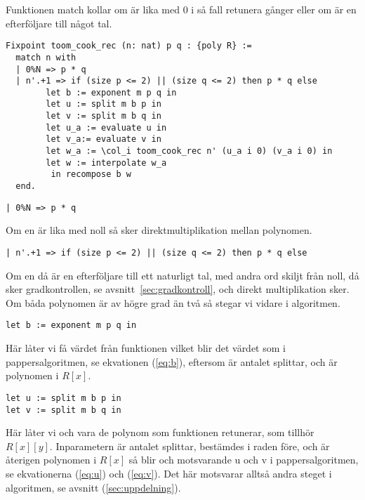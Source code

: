 Funktionen match kollar om  är lika med 0 i så fall retunera  gånger
 eller om  är en efterföljare till något tal.


\begin{lstlisting}
Fixpoint toom_cook_rec (n: nat) p q : {poly R} :=
  match n with
  | 0%N => p * q
  | n'.+1 => if (size p <= 2) || (size q <= 2) then p * q else
        let b := exponent m p q in
        let u := split m b p in
        let v := split m b q in
        let u_a := evaluate u in
        let v_a:= evaluate v in
        let w_a := \col_i toom_cook_rec n' (u_a i 0) (v_a i 0) in
        let w := interpolate w_a
         in recompose b w
  end.
\end{lstlisting}

\begin{lstlisting}
| 0%N => p * q
\end{lstlisting}

Om en  är lika med noll så sker direktmultiplikation mellan polynomen.

\begin{lstlisting}
| n'.+1 => if (size p <= 2) || (size q <= 2) then p * q else
\end{lstlisting}

Om en  då är en efterföljare till ett naturligt tal, med andra ord skiljt
från noll, då sker gradkontrollen, se avsnitt~\ref{sec:gradkontroll}, och direkt
multiplikation sker. Om båda polynomen är av högre grad än två så stegar vi
vidare i algoritmen.

\begin{lstlisting}
let b := exponent m p q in
\end{lstlisting}

Här låter vi  få värdet från funktionen  vilket blir det
värdet som i pappersalgoritmen, se ekvationen (\ref{eq:b}), eftersom  är
antalet splittar,  och  är polynomen i $R[x]$.

\begin{lstlisting}
let u := split m b p in
let v := split m b q in
\end{lstlisting}

Här låter vi  och  vara de polynom som funktionen 
retunerar, som tillhör $R[x][y]$. Inparametern  är antalet splittar, 
bestämdes i raden före,  och  är återigen polynomen i $R[x]$ så blir 
 och  motsvarande u och v i pappersalgoritmen, se ekvationerna
(\ref{eq:u}) och (\ref{eq:v}). Det här motsvarar alltså andra steget i
algoritmen, se avsnitt (\ref{sec:uppdelning}).

